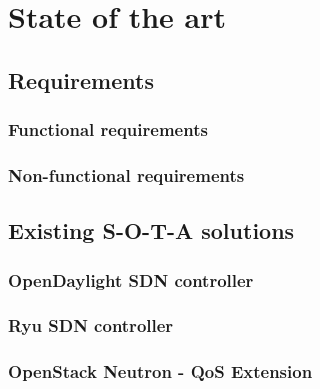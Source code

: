 \chapter{State of the art}

\section{Requirements}

\subsection{Functional requirements}

\subsection{Non-functional requirements}

\section{Existing S-O-T-A solutions}

\subsection{OpenDaylight SDN controller}

\subsection{Ryu SDN controller}

\subsection{OpenStack Neutron - QoS Extension}